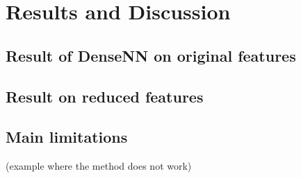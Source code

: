 
\section{Results and Discussion}


\subsection{Result of DenseNN on original features}

\subsection{Result on reduced features}

\subsection{Main limitations}

(example where the method does not work) 